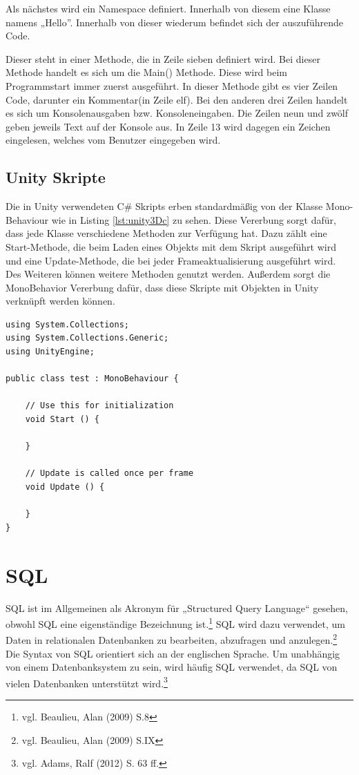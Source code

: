 	Als nächstes wird ein Namespace definiert. Innerhalb von diesem eine Klasse namens „Hello”. Innerhalb von dieser wiederum befindet sich der auszuführende Code.

	Dieser steht in einer Methode, die in Zeile sieben definiert wird. Bei dieser Methode handelt es sich um die Main() Methode. Diese wird beim Programmstart immer zuerst ausgeführt. In dieser Methode gibt es vier Zeilen Code, darunter ein Kommentar(in Zeile elf). Bei den anderen drei Zeilen handelt es sich um Konsolenausgaben bzw. Konsoleneingaben. Die Zeilen neun und zwölf geben jeweils Text auf der Konsole aus. In Zeile 13 wird dagegen ein Zeichen eingelesen, welches vom Benutzer eingegeben wird.

\subsection{Unity Skripte}

	Die in Unity verwendeten C\# Skripts erben standardmäßig von der Klasse Mono-Behaviour wie in Listing \ref{lst:unity3Dc} zu sehen. Diese Vererbung sorgt dafür, dass jede Klasse verschiedene Methoden zur Verfügung hat. Dazu zählt eine Start-Methode, die beim Laden eines Objekts mit dem Skript ausgeführt wird und eine Update-Methode, die bei jeder Frameaktualisierung ausgeführt wird. Des Weiteren können weitere Methoden genutzt werden. Außerdem sorgt die MonoBehavior Vererbung dafür, dass diese Skripte mit Objekten in Unity verknüpft werden können.

	\begin{scriptsize}
	\lstset{
		float,
		caption=Aufbau eines Unity Skriptes, 
		language=[Sharp]C, 	
		frame=single,  
		showstringspaces=false, 
		showspaces=false, 
		numbers=left, 
		captionpos=b, 
		belowcaptionskip=4pt,
		basicstyle=\ttfamily
	} 
	\begin{lstlisting}[label=lst:unity3Dc]
using System.Collections;
using System.Collections.Generic;
using UnityEngine;

public class test : MonoBehaviour {

	// Use this for initialization
	void Start () {
		
	}
	
	// Update is called once per frame
	void Update () {
		
	}
}
	\end{lstlisting}
	\end{scriptsize}	

\section{SQL}

	SQL ist im Allgemeinen als Akronym für „Structured Query Language“ gesehen, obwohl SQL eine eigenständige Bezeichnung ist.\footnote{vgl. Beaulieu, Alan\cite{sql1} (2009) S.8} SQL wird dazu verwendet, um Daten in relationalen Datenbanken zu bearbeiten, abzufragen und anzulegen.\footnote{vgl. Beaulieu, Alan\cite{sql1} (2009) S.IX} Die Syntax von SQL orientiert sich an der englischen Sprache. Um unabhängig von einem Datenbanksystem zu sein, wird häufig SQL verwendet, da SQL von vielen Datenbanken unterstützt wird.\footnote{vgl. Adams, Ralf\cite{sql2} (2012) S. 63 ff.}